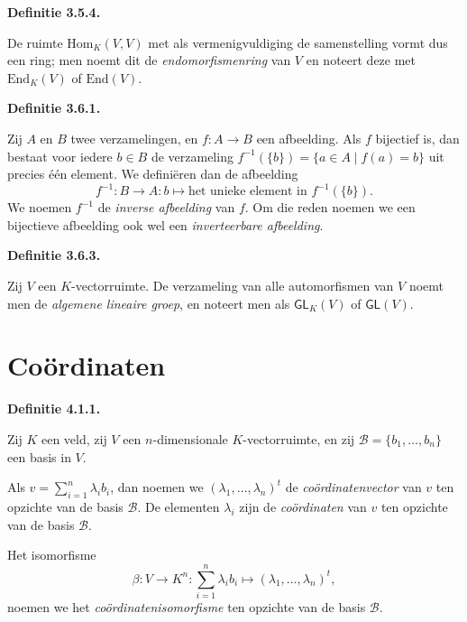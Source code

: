 \documentclass[10pt,a4paper]{article}
\newenvironment{res}[1]{%
  \par\noindent\textbf{Definitie #1.}~\ignorespaces
}{%
  \par\vspace{2pt}\normalfont
}
\begin{document}
\begin{res}{3.5.4}
De ruimte $\mathrm{Hom}_K(V,V)$ met als vermenigvuldiging de samenstelling vormt dus een ring; men noemt dit de \textit{endomorfismenring} van $V$ en noteert deze met $\mathrm{End}_K(V)$ of $\mathrm{End}(V)$.
\end{res}

\begin{res}{3.6.1}
Zij $A$ en $B$ twee verzamelingen, en $f:A\to B$ een afbeelding. Als $f$ bijectief is, dan bestaat voor iedere $b\in B$ de verzameling $f^{-1}(\{b\})=\{a\in A\mid f(a)=b\}$ uit precies \'e\'en element. We defini\"eren dan de afbeelding
\[
f^{-1}:B\to A:b\mapsto \text{het unieke element in } f^{-1}(\{b\}).
\]
We noemen $f^{-1}$ de \textit{inverse afbeelding} van $f$. Om die reden noemen we een bijectieve afbeelding ook wel een \textit{inverteerbare afbeelding}.
\end{res}

\begin{res}{3.6.3}
Zij $V$ een $K$-vectorruimte. De verzameling van alle automorfismen van $V$ noemt men de \textit{algemene lineaire groep}, en noteert men als $\mathsf{GL}_K(V)$ of $\mathsf{GL}(V)$.
\end{res}

\section{Co\"ordinaten}

\begin{res}{4.1.1}
Zij $K$ een veld, zij $V$ een $n$-dimensionale $K$-vectorruimte, en zij $\mathcal B=\{b_1,\dots,b_n\}$ een basis in $V$.
\begin{myenum}
\item Als $v=\sum_{i=1}^n \lambda_ib_i$, dan noemen we $(\lambda_1,\dots,\lambda_n)^t$ de \textit{co\"ordinatenvector} van $v$ ten opzichte van de basis $\mathcal B$. De elementen $\lambda_i$ zijn de \textit{co\"ordinaten} van $v$ ten opzichte van de basis $\mathcal B$.
\item Het isomorfisme
\[
\beta:V\to K^n:\sum_{i=1}^n \lambda_ib_i\mapsto (\lambda_1,\dots,\lambda_n)^t,
\]
noemen we het \textit{co\"ordinatenisomorfisme} ten opzichte van de basis $\mathcal B$.
\end{myenum}
\end{res}
\end{document}
